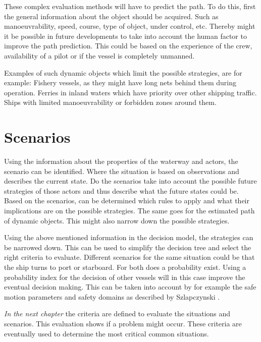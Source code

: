 These complex evaluation methods will have to predict the path. To do this, first the general information about the object should be acquired. Such as manoeuvrability, speed, course, type of object, under control, etc.
Thereby might it be possible in future developments to take into account the human factor to improve the path prediction. This could be based on the experience of the crew, availability of a pilot or if the vessel is completely unmanned.

Examples of such dynamic objects which limit the possible strategies, are for example: Fishery vessels, as they might have long nets behind them during operation. Ferries in inland waters which have priority over other shipping traffic. Ships with limited manoeuvrability or forbidden zones around them.

\section{Scenarios}
Using the information about the properties of the waterway and actors, the scenario can be identified. Where the situation is based on observations and describes the current state. Do the scenarios take into account the possible future strategies of those actors and thus describe what the future states could be.
Based on the scenarios, can be determined which rules to apply and what their implications are on the possible strategies. The same goes for the estimated path of dynamic objects. This might also narrow down the possible strategies.

Using the above mentioned information in the decision model, the strategies can be narrowed down. This can be used to simplify the decision tree and select the right criteria to evaluate.
Different scenarios for the same situation could be that the ship turns to port or starboard. For both does a probability exist. Using a probability index for the decision of other vessels will in this case improve the eventual decision making. This can be taken into account by for example the safe motion parameters and safety domains as described by Szlapczynski \cite{Szlapczynski2017}\cite{Szlapczynski2017a}.

\vspace{1.5cm}
\emph{In the next chapter} the criteria are defined to evaluate the situations and scenarios. This evaluation shows if a problem might occur. These criteria are eventually used to determine the most critical common situations. 

